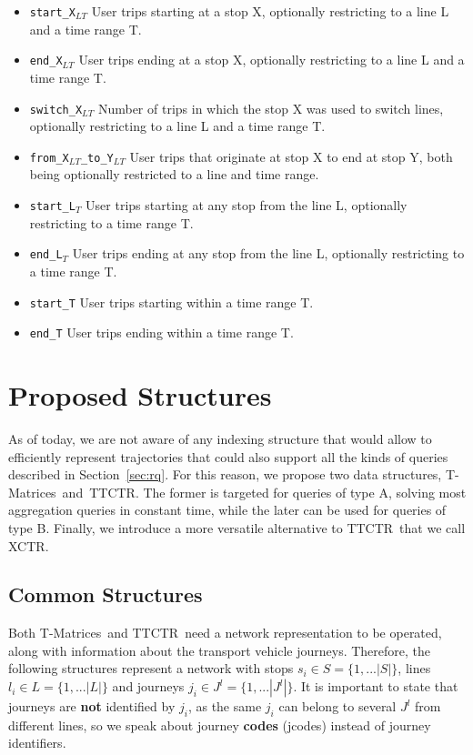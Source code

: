 \documentclass[runningheads]{llncs}
\newcommand{\acumm}{T-Matrices} %
\newcommand{\ctr}{XCTR}
\newcommand{\ttctr}{TTCTR}
\begin{document}
\begin{enumerate}[A)]
    \begin{itemize}
        \item \texttt{start\_X$_{LT}$} User trips starting at a stop X, optionally restricting to a line L and a time range T.
        \item \texttt{end\_X$_{LT}$} User trips ending at a stop X, optionally restricting to a line L and a time range T.
        \item \texttt{switch\_X$_{LT}$} Number of trips in which the stop X was used to switch lines, optionally restricting to a line L and a time range T.
        \item \texttt{from\_X$_{LT}$\_to\_Y$_{LT}$} User trips that originate at stop X to end at stop Y, both being optionally restricted to a line and time range.
        \item \texttt{start\_L$_T$} User trips starting at any stop from the line L, optionally restricting to a time range T.
        \item \texttt{end\_L$_T$} User trips ending at any stop from the line L, optionally restricting to a time range T.
        \item \texttt{start\_T} User trips starting within a time range T.
        \item \texttt{end\_T} User trips ending within a time range T.
    \end{itemize}
\end{enumerate}

\section{Proposed Structures}
\label{sec:ps}
As of today, we are not aware of any indexing structure that would allow to efficiently represent trajectories that could also support all the kinds of queries described in Section~\ref{sec:rq}. For this reason, we propose two data structures, \acumm~and~\ttctr. The former is targeted for queries of type A, solving most aggregation queries in constant time, while the later can be used for queries of type B. Finally, we introduce a more versatile alternative to \ttctr~that we call \ctr.

\subsection{Common Structures}
\label{sec:cs}
Both \acumm~and \ttctr~need a network representation to be operated, along with information about the transport vehicle journeys. Therefore, the following structures represent a network with stops $s_i \in S = \{1,...|S|\}$, lines $l_i \in L = \{1,...|L|\}$ and journeys $j_i \in J^l = \{1,...|J^l|\}$. It is important to state that journeys are \textbf{not} identified by $j_i$, as the same $j_i$ can belong to several $J^l$ from different lines, so we speak about journey \textbf{codes} (jcodes) instead of journey identifiers.
\end{document}
